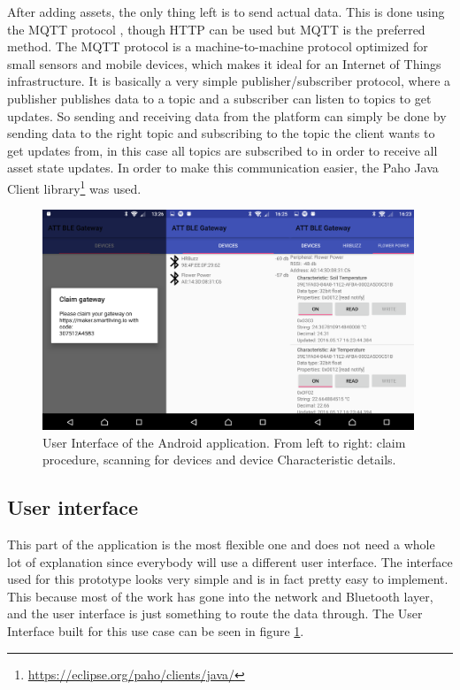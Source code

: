 \documentclass[pdftex,a4paper,12pt,twoside]{report}
\begin{document}
After adding assets, the only thing left is to send actual data. This is done using the MQTT protocol \citep{waher2015learning}, though HTTP can be used but MQTT is the preferred method. The MQTT protocol is a machine-to-machine protocol optimized for small sensors and mobile devices, which makes it ideal for an Internet of Things infrastructure. It is basically a very simple publisher/subscriber protocol, where a publisher publishes data to a topic and a subscriber can listen to topics to get updates. So sending and receiving data from the platform can simply be done by sending data to the right topic and subscribing to the topic the client wants to get updates from, in this case all topics are subscribed to in order to receive all asset state updates. In order to make this communication easier, the Paho Java Client library\footnote{\url{https://eclipse.org/paho/clients/java/}} was used.

\begin{figure}[h]
    \centering
    \includegraphics[width=0.99\textwidth]{img/android.png}
    \caption[User Interface of the Android application]{User Interface of the Android application. From left to right: claim procedure, scanning for devices and device Characteristic details.}
    \label{fig:androidscreens}
\end{figure}

\subsection{User interface}
\label{subsec:userinterface}
This part of the application is the most flexible one and does not need a whole lot of explanation since everybody will use a different user interface. The interface used for this prototype looks very simple and is in fact pretty easy to implement. This because most of the work has gone into the network and Bluetooth layer, and the user interface is just something to route the data through. The User Interface built for this use case can be seen in figure \ref{fig:androidscreens}.
\end{document}
